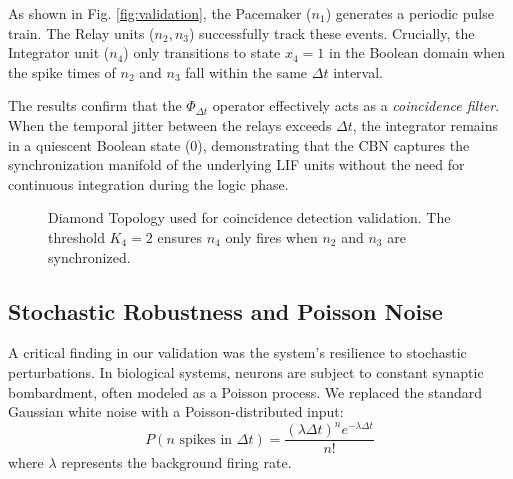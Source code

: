 \documentclass[10pt, conference]{IEEEtran}
\begin{document}
As shown in Fig. \ref{fig:validation}, the Pacemaker ($n_1$) generates a periodic pulse train. The Relay units ($n_2, n_3$) successfully track these events. Crucially, the Integrator unit ($n_4$) only transitions to state $x_{4}=1$ in the Boolean domain when the spike times of $n_2$ and $n_3$ fall within the same $\Delta t$ interval.

The results confirm that the $\Phi_{\Delta t}$ operator effectively acts as a \textit{coincidence filter}. When the temporal jitter between the relays exceeds $\Delta t$, the integrator remains in a quiescent Boolean state ($0$), demonstrating that the CBN captures the synchronization manifold of the underlying LIF units without the need for continuous integration during the logic phase.

\begin{figure}[h]
    \centering
    \caption{Diamond Topology used for coincidence detection validation. The threshold $K_4=2$ ensures $n_4$ only fires when $n_2$ and $n_3$ are synchronized.}
\end{figure}

\subsection{Stochastic Robustness and Poisson Noise}

A critical finding in our validation was the system's resilience to stochastic perturbations. In biological systems, neurons are subject to constant synaptic bombardment, often modeled as a Poisson process. We replaced the standard Gaussian white noise with a Poisson-distributed input:
\begin{equation}
    P(n \text{ spikes in } \Delta t) = \frac{(\lambda \Delta t)^n e^{-\lambda \Delta t}}{n!}
\end{equation}
where $\lambda$ represents the background firing rate. 
\end{document}
